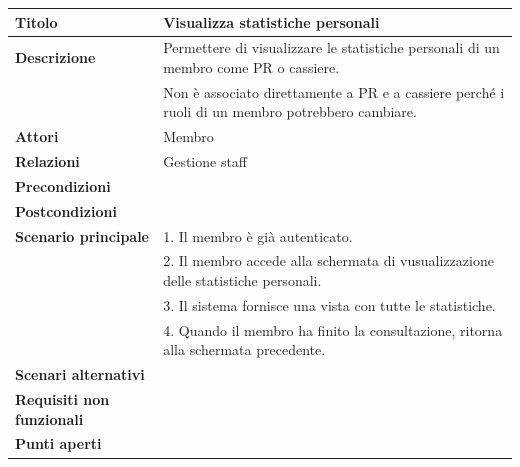 \documentclass[a4paper]{article}
\begin{document}


\begin{center}
\begin{tabularx}{1\textwidth}{|l|X|}
    \hline
	\textbf{Titolo} & Visualizza statistiche personali \\
	\hline
	\textbf{Descrizione} & Permettere di visualizzare le statistiche personali di un membro come PR o cassiere. \\
						 & Non è associato direttamente a PR e a cassiere perché i ruoli di un membro potrebbero cambiare.\\
	\hline
	\textbf{Attori} & Membro \\
	\hline
	\textbf{Relazioni} & Gestione staff \\
	\hline
	\textbf{Precondizioni} &  \\
	\hline
	\textbf{Postcondizioni} &  \\
	\hline
	\textbf{Scenario principale} & 1. Il membro è già autenticato.\\
	                             & 2. Il membro accede alla schermata di vusualizzazione delle statistiche personali.\\
								 & 3. Il sistema fornisce una vista con tutte le statistiche. \\
								 & 4. Quando il membro ha finito la consultazione, ritorna alla schermata precedente.\\
	\hline
	\textbf{Scenari alternativi} & \\
	\hline
	\textbf{Requisiti non funzionali} & \\
	\hline
	\textbf{Punti aperti} & \\
	\hline
\end{tabularx}
\end{center}

\end{document}
